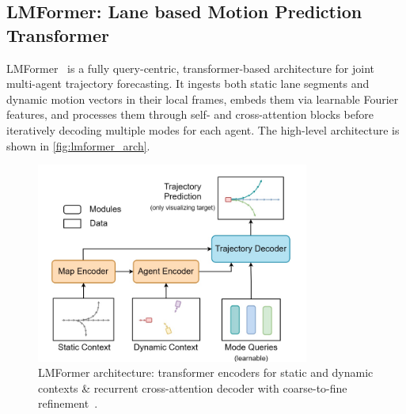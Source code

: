 \subsection{LMFormer: Lane based Motion Prediction Transformer}
\label{ssec:lmformer}

LMFormer~\cite{lmformerYadav2025} is a fully query-centric, transformer-based architecture for joint multi-agent trajectory forecasting. It ingests both static lane segments and dynamic motion vectors in their local frames, embeds them via learnable Fourier features, and processes them through self- and cross-attention blocks before iteratively decoding multiple modes for each agent. The high-level architecture is shown in \autoref{fig:lmformer_arch}.

\begin{figure}[ht]
  \centering
  \includegraphics[width=0.8\textwidth]{figures/lmformer_arch.png}
  \caption{LMFormer architecture: transformer encoders for static and dynamic contexts \& recurrent cross-attention decoder with coarse-to-fine refinement~\cite{lmformerYadav2025}.}
  \label{fig:lmformer_arch}
\end{figure}


